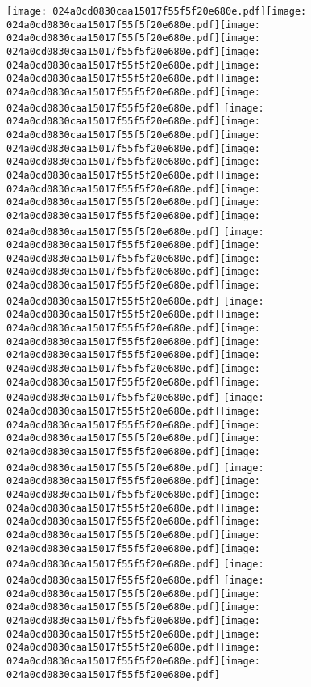 \documentclass{article}
\newcommand{\origpg}[2]{\texttt{[image: 024a0cd0830caa15017f55f5f20e680e.pdf]}}
\begin{document}
{\vspace{27.944pt}\hspace{18.094pt}\origpg5{103.4pt 655.2pt 112.37pt 671.34pt}\origpg5{112.31pt 655.2pt 119.47pt 671.34pt}\origpg5{119.52pt 655.2pt 125.9pt 671.34pt}\hspace{-0.113pt}\origpg5{125.78pt 655.2pt 133.4pt 671.34pt}\origpg5{133.48pt 655.2pt 142.12pt 671.34pt}\origpg5{142.12pt 655.2pt 149.17pt 671.34pt}\origpg5{149.17pt 655.2pt 157.81pt 671.34pt}\origpg5{157.81pt 655.2pt 164.97pt 671.34pt} \origpg5{171.28pt 655.2pt 179.92pt 671.34pt}\origpg5{179.92pt 655.2pt 187.99pt 671.34pt}\hspace{-0.323pt}\origpg5{187.66pt 655.2pt 195.28pt 671.34pt}\origpg5{195.36pt 655.2pt 202.53pt 671.34pt}\hspace{-0.42pt}\origpg5{202.11pt 655.2pt 210.33pt 671.34pt}\origpg5{210.33pt 655.2pt 217.49pt 671.34pt}\hspace{-0.21pt}\origpg5{217.28pt 655.2pt 225.92pt 671.34pt}\origpg5{225.92pt 655.2pt 234.55pt 671.34pt}\origpg5{234.62pt 655.2pt 242.04pt 671.34pt} \origpg5{248.58pt 655.2pt 257.21pt 671.34pt}\hspace{-0.21pt}\origpg5{257pt 655.2pt 264.17pt 671.34pt}\origpg5{264.22pt 655.2pt 276.65pt 671.34pt}\origpg5{276.73pt 655.2pt 283.89pt 671.34pt}\hspace{-0.178pt}\origpg5{283.72pt 655.2pt 292.35pt 671.34pt} \origpg5{298.63pt 655.2pt 305.8pt 671.34pt}\origpg5{305.84pt 655.2pt 314.48pt 671.34pt}\origpg5{314.48pt 655.2pt 321.65pt 671.34pt}\origpg5{321.73pt 655.2pt 328.78pt 671.34pt}\origpg5{328.71pt 655.2pt 335.88pt 671.34pt}\hspace{-0.177pt}\origpg5{335.7pt 655.2pt 345.92pt 671.34pt}\hspace{-0.339pt}\origpg5{345.58pt 655.2pt 356.43pt 671.34pt} \origpg5{362.92pt 655.2pt 373.13pt 671.34pt}\origpg5{373.04pt 655.2pt 381.11pt 671.34pt}\hspace{-0.344pt}\origpg5{380.76pt 655.2pt 391.92pt 671.34pt}\origpg5{391.85pt 655.2pt 400.49pt 671.34pt}\origpg5{400.49pt 655.2pt 408.56pt 671.34pt} \origpg5{415pt 655.2pt 423.07pt 671.34pt}\hspace{-0.113pt}\origpg5{422.96pt 655.2pt 431.59pt 671.34pt}\origpg5{431.59pt 655.2pt 440.23pt 671.34pt}\origpg5{440.29pt 655.2pt 447.46pt 671.34pt}\hspace{0.291pt}\origpg5{447.75pt 655.2pt 454.92pt 671.34pt}\hspace{-0.42pt}\origpg5{454.5pt 655.2pt 461.55pt 671.34pt}\origpg5{461.48pt 655.2pt 468.84pt 671.34pt} \origpg5{475.2pt 655.2pt 482.37pt 671.34pt} \origpg5{488.68pt 655.2pt 497.32pt 671.34pt}\origpg5{497.32pt 655.2pt 505.39pt 671.34pt}\hspace{-0.323pt}\origpg5{505.06pt 655.2pt 515.28pt 671.34pt}\origpg5{515.18pt 655.2pt 523.25pt 671.34pt}\hspace{-0.113pt}\origpg5{523.14pt 655.2pt 535.57pt 671.34pt}\hspace{-0.145pt}\origpg5{535.42pt 655.2pt 542.78pt 671.34pt}\origpg5{542.88pt 655.2pt 554.94pt 671.34pt} 

}
\end{document}
